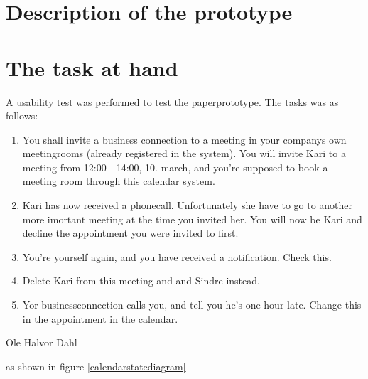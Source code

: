 \documentclass{article}
\begin{document}




\section{Description of the prototype}

\section{The task at hand}
A usability test was performed to test the paperprototype. The tasks was as follows:
\begin{enumerate}

\item You shall invite a business connection to a meeting in your companys own meetingrooms (already registered in the system). You will invite Kari to a meeting from 12:00 - 14:00, 10. march, and you're supposed to book a meeting room through this calendar system.

\item Kari has now received a phonecall. Unfortunately she have to go to another more imortant meeting at the time you invited her. You will now be Kari and decline the appointment you were invited to first.

\item You're yourself again, and you have received a notification. Check this.

\item Delete Kari from this meeting and and Sindre instead.

\item Yor businessconnection calls you, and tell you he's one hour late. Change this in the appointment in the calendar.
\end{enumerate}


Ole Halvor Dahl


as shown in figure \ref{calendarstatediagram}
\end{document}
